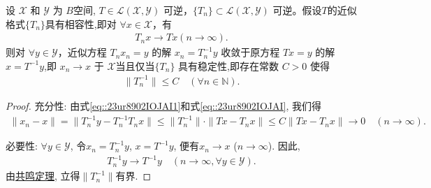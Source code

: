 \documentclass[../../main.tex]{subfiles}%
\begin{document}
\begin{theorem}[Lax定理]\label{theorem:泛函分析--Lax定理}
设 $\mathscr{X} $ 和 $\mathscr{Y} $ 为 $B$空间,  $T\in\mathscr{L} (\mathscr{X} ,\mathscr{Y} )$ 可逆，$\{T_n\}\subset\mathscr{L} (\mathscr{X} ,\mathscr{Y} )$ 可逆。假设$T$的近似格式$\{T_n\}$具有相容性,即对 $\forall x\in\mathscr{X} $，有
\begin{align}\label{eq::23ur8902IOJAI1}
T_nx\to Tx(n\to \infty).
\end{align}
则对 $\forall y\in\mathscr{Y} $，近似方程 $T_nx_n=y$ 的解 $x_n = T_n^{-1}y$ 收敛于原方程 $Tx=y$ 的解 $x = T^{-1}y$,即 $x_n\to x$ 于 $\mathscr{X} $当且仅当$\{T_n\}$ 具有稳定性,即存在常数 $C>0$ 使得
\begin{align}
\|T_n^{-1}\| \leqslant C \quad (\forall n\in\mathbb{N}).\label{eq::23ur8902IOJAI}
\end{align}
\end{theorem}
\begin{proof}

{\heiti 充分性:} 由式\eqref{eq::23ur8902IOJAI1}和式\eqref{eq::23ur8902IOJAI}, 我们得
\begin{align*}
\|x_n - x\| = \|T_n^{-1}y - T_n^{-1}T_nx\| 
\leqslant \|T_n^{-1}\| \cdot \|Tx - T_nx\| 
\leqslant C\|Tx - T_nx\| \to 0 \quad (n\to\infty).
\end{align*}

{\heiti 必要性:} $\forall y\in\mathscr{Y}$, 令$x_n=T_n^{-1}y$, $x=T^{-1}y$, 便有$x_n\to x$ ($n\to\infty$). 因此,
\begin{align*}
T_n^{-1}y \to T^{-1}y \quad (n\to\infty, \forall y\in\mathscr{Y}).
\end{align*}
由\hyperref[theorem:泛函分析--共鸣定理]{共鸣定理}, 立得$\|T_n^{-1}\|$有界.
\end{proof}
\end{document}
